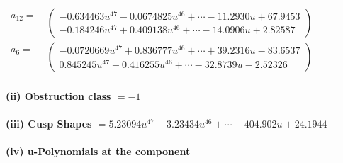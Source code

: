 \documentclass[1p]{elsarticle_modified}
\theoremstyle{definition}
\begin{document}
\begin{tabular}{m{7pt} m{180pt} m{7pt} m{180pt} }
\flushright $a_{12}=$&$\begin{pmatrix}-0.634463 u^{47}-0.0674825 u^{46}+\cdots-11.2930 u+67.9453\\-0.184246 u^{47}+0.409138 u^{46}+\cdots-14.0906 u+2.82587\end{pmatrix}$ \\
\flushright $a_{6}=$&$\begin{pmatrix}-0.0720669 u^{47}+0.836777 u^{46}+\cdots+39.2316 u-83.6537\\0.845245 u^{47}-0.416255 u^{46}+\cdots-32.8739 u-2.52326\end{pmatrix}$\\&\end{tabular}
\flushleft \textbf{(ii) Obstruction class $= -1$}\\~\\
\flushleft \textbf{(iii) Cusp Shapes $= 5.23094 u^{47}-3.23434 u^{46}+\cdots-404.902 u+24.1944$}\\~\\
\newpage\renewcommand{\arraystretch}{1}
\flushleft \textbf{(iv) u-Polynomials at the component}\newline \\
\end{document}
